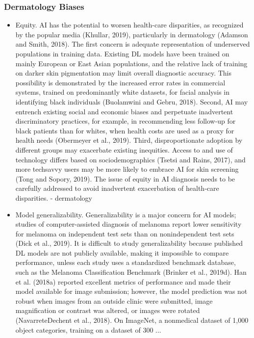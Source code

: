 \documentclass[12pt, a4paper, oneside]{book}   	%
\renewcommand{\paragraph}[1]{%
	\subsubsection*{#1}%
}
\begin{document}
			\paragraph{Dermatology Biases}
			\begin{itemize}
				\item Equity. AI has the potential to worsen health-care disparities, as recognized by the popular media (Khullar, 2019), particularly in dermatology (Adamson and Smith, 2018). The first concern is adequate representation of underserved populations in training data. Existing DL models have been trained on mainly European or East Asian populations, and the relative lack of training on darker skin pigmentation may limit overall diagnostic accuracy. This possibility is demonstrated by the increased error rates in commercial systems, trained on predominantly white datasets, for facial analysis in identifying black individuals (Buolamwini and Gebru, 2018). Second, AI may entrench existing social and economic biases and perpetuate inadvertent discriminatory practices, for example, in recommending less follow-up for black patients than for whites, when health costs are used as a proxy for health needs (Obermeyer et al., 2019). Third, disproportionate adoption by different groups may exacerbate existing inequities. Access to and use of technology differs based on sociodemographics (Tsetsi and Rains, 2017), and more techsavvy users may be more likely to embrace AI for skin screening (Tong and Sopory, 2019). The issue of equity in AI diagnosis needs to be carefully addressed to avoid inadvertent exacerbation of health-care disparities. \autocite{Young_2020} - dermatology
				\item Model generalizability. Generalizability is a major concern for AI models; studies of computer-assisted diagnosis of melanoma report lower sensitivity for melanoma on independent test sets than on nonindependent test sets (Dick et al., 2019). It is difficult to study generalizability because published DL models are not publicly available, making it impossible to compare performance, unless each study uses a standardized benchmark database, such as the Melanoma Classification Benchmark (Brinker et al., 2019d). Han et al. (2018a) reported excellent metrics of performance and made their model available for image submission; however, the model prediction was not robust when images from an outside clinic were submitted, image magnification or contrast was altered, or images were rotated (NavarreteDechent et al., 2018). On ImageNet, a nonmedical dataset of 1,000 object categories, training on a dataset of 300 ... \autocite{Young_2020}
			\end{itemize}
\end{document}
